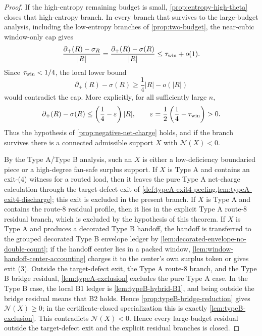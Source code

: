 \documentclass[11pt]{article}
\newcommand{\defp}{\partial_+}
\newcommand{\No}{\mathcal N}
\begin{document}
\begin{proof}
If the high-entropy remaining budget is small, \cref{prop:entropy-high-theta}
closes that high-entropy branch.  In every branch that survives to the
large-budget analysis, including the low-entropy branches of
\cref{prop:two-budget}, the near-cubic window-only cap gives
\[
\frac{\defp(R)-\sigma_R}{|R|}
=\frac{\defp(R)-\sigma(R)}{|R|}
\le\tau_{\rm win}+o(1).
\]
Since $\tau_{\rm win}<1/4$, the local lower bound
\[
\defp(R)-\sigma(R)\ge\frac14|R|-o(|R|)
\]
would contradict the cap.  More explicitly, for all sufficiently large $n$,
\[
\defp(R)-\sigma(R)
\le
\left(\frac14-\varepsilon\right)|R|,
\qquad
\varepsilon=\frac12\left(\frac14-\tau_{\rm win}\right)>0 .
\]
Thus the hypothesis of \cref{prop:negative-net-charge} holds, and if the branch
survives there is a connected admissible support $X$ with $\No(X)<0$.

By the Type A/Type B analysis, such an $X$ is either a low-deficiency boundaried piece or a
high-degree fan-safe surplus support.  If $X$ is Type A and contains an exit-(4)
witness for a routed load, then it leaves the pure Type A net-charge calculation
through the target-defect exit of
\cref{def:typeA-exit4-peeling,lem:typeA-exit4-discharge}; this exit is excluded
in the present branch.  If $X$ is Type A and contains the route-8 residual
profile, then it lies in the explicit Type A route-8 residual branch, which is
excluded by the hypothesis of this theorem.  If $X$ is Type A and produces a
decorated Type B handoff, the handoff is transferred to the
grouped decorated Type B envelope ledger by
\cref{lem:decorated-envelope-no-double-count}; if the handoff center lies in a
packed window, \cref{lem:window-handoff-center-accounting} charges it to the
center's own surplus token or gives exit (3).  Outside the target-defect exit,
the Type A route-8 branch, and the Type B bridge residual,
\cref{lem:typeA-exclusion} excludes the pure Type A case.  In the Type
B case, the local B1 ledger is \cref{lem:typeB-hybrid-B1}, and being outside the
bridge residual means that B2 holds.  Hence
\cref{prop:typeB-bridge-reduction} gives $\No(X)\ge0$; in the
certificate-closed specialization this is exactly \cref{lem:typeB-exclusion}.
This contradicts $\No(X)<0$.  Hence every large-budget residual outside the
target-defect exit and the explicit residual branches is closed.
\end{proof}
\end{document}
